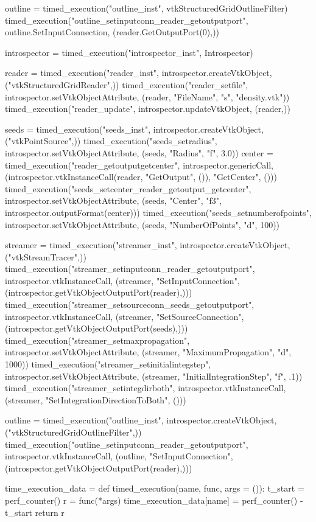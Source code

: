 \begin{appendices}
\begin{python}[label=lst:py-native-vtk,caption={Native Python VTK benchmark script},aboveskip=20pt]
outline = timed_execution("outline_inst", vtkStructuredGridOutlineFilter)
timed_execution("outline_setinputconn_reader_getoutputport", outline.SetInputConnection, (reader.GetOutputPort(0),))
\end{python}

\begin{python}[label=lst:py-intro-vtk,caption={Introspective Python VTK benchmark script},aboveskip=20pt]
introspector = timed_execution("introspector_inst", Introspector)

reader = timed_execution("reader_inst", introspector.createVtkObject, ("vtkStructuredGridReader",))
timed_execution("reader_setfile", introspector.setVtkObjectAttribute, (reader, "FileName", "s", "density.vtk"))
timed_execution("reader_update", introspector.updateVtkObject, (reader,))

seeds = timed_execution("seeds_inst", introspector.createVtkObject, ("vtkPointSource",))
timed_execution("seeds_setradius", introspector.setVtkObjectAttribute, (seeds, "Radius", "f", 3.0))
center = timed_execution("reader_getoutputgetcenter", introspector.genericCall, (introspector.vtkInstanceCall(reader, "GetOutput", ()), "GetCenter", ()))
timed_execution("seeds_setcenter_reader_getoutput_getcenter", introspector.setVtkObjectAttribute, (seeds, "Center", "f3", introspector.outputFormat(center)))
timed_execution("seeds_setnumberofpoints", introspector.setVtkObjectAttribute, (seeds, "NumberOfPoints", "d", 100))

streamer = timed_execution("streamer_inst", introspector.createVtkObject, ("vtkStreamTracer",))
timed_execution("streamer_setinputconn_reader_getoutputport", introspector.vtkInstanceCall, (streamer, "SetInputConnection", (introspector.getVtkObjectOutputPort(reader),)))
timed_execution("streamer_setsourceconn_seeds_getoutputport", introspector.vtkInstanceCall, (streamer, "SetSourceConnection", (introspector.getVtkObjectOutputPort(seeds),)))
timed_execution("streamer_setmaxpropagation", introspector.setVtkObjectAttribute, (streamer, "MaximumPropagation", "d", 1000))
timed_execution("streamer_setinitialintegstep", introspector.setVtkObjectAttribute, (streamer, "InitialIntegrationStep", "f", .1))
timed_execution("streamer_setintegdirboth", introspector.vtkInstanceCall, (streamer, "SetIntegrationDirectionToBoth", ()))

outline = timed_execution("outline_inst", introspector.createVtkObject, ("vtkStructuredGridOutlineFilter",))
timed_execution("outline_setinputconn_reader_getoutputport", introspector.vtkInstanceCall, (outline, "SetInputConnection", (introspector.getVtkObjectOutputPort(reader),)))
\end{python}

\begin{python}[label=lst:py-timed-execution,caption={timed\_execution Python function},aboveskip=20pt]
time_execution_data = {}
def timed_execution(name, func, args = ()):
	t_start = perf_counter()
	r = func(*args)
	time_execution_data[name] = perf_counter() - t_start
	return r
\end{python}

\end{appendices}